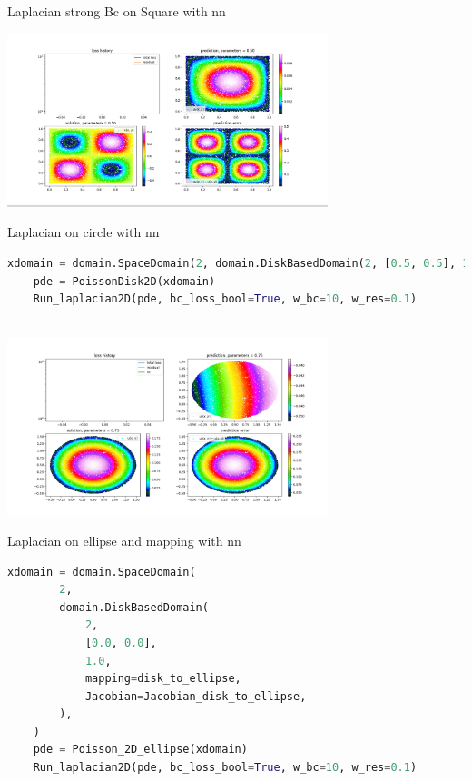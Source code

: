 \documentclass[12pt]{article}
\begin{document}
\begin{enumerate}
Laplacian strong Bc on Square with nn
\begin{frame}{}
    \begin{center}
        \includegraphics[width=0.7\textwidth]{images/scimbaplot1.png}
    \end{center}
\end{frame}
Laplacian on circle with nn
\begin{lstlisting}[language=Python,caption={},frame=single, backgroundcolor=\color{gray!10}, basicstyle=\footnotesize,rulecolor=\color{blue}, framexleftmargin=3pt, commentstyle=\color{mygreen}, keywordstyle=\color{blue}]
    xdomain = domain.SpaceDomain(2, domain.DiskBasedDomain(2, [0.5, 0.5], 1.0))
    pde = PoissonDisk2D(xdomain)
    Run_laplacian2D(pde, bc_loss_bool=True, w_bc=10, w_res=0.1)
    
\end{lstlisting}
\begin{frame}{}
    \begin{center}
        \includegraphics[width=0.7\textwidth]{images/scimbaplot2.png}
        \end{center}
\end{frame}

\newpage

Laplacian on ellipse and mapping with nn
\begin{lstlisting}[language=Python,caption={},frame=single, backgroundcolor=\color{gray!10}, basicstyle=\footnotesize,rulecolor=\color{blue}, framexleftmargin=3pt, commentstyle=\color{mygreen}, keywordstyle=\color{blue}]
    xdomain = domain.SpaceDomain(
        2,
        domain.DiskBasedDomain(
            2,
            [0.0, 0.0],
            1.0,
            mapping=disk_to_ellipse,
            Jacobian=Jacobian_disk_to_ellipse,
        ),
    )
    pde = Poisson_2D_ellipse(xdomain)
    Run_laplacian2D(pde, bc_loss_bool=True, w_bc=10, w_res=0.1)
    

\end{lstlisting}
\end{enumerate}
\end{document}
